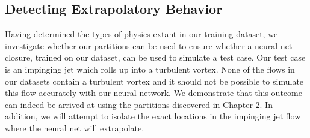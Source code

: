 \subsection{Detecting Extrapolatory Behavior}

Having determined the types of physics extant in our training dataset, we investigate whether our partitions can be used to ensure whether a neural net closure, trained on our dataset, can be used to simulate a test case. Our test case is an impinging jet which rolls up into a turbulent vortex. None of the ﬂows in our datasets contain a turbulent vortex and it should not be possible to simulate this ﬂow accurately with our neural network. We demonstrate that this outcome can indeed be arrived at using the partitions discovered in Chapter 2. In addition, we will attempt to isolate the exact locations in the impinging jet ﬂow where the neural net will extrapolate.

